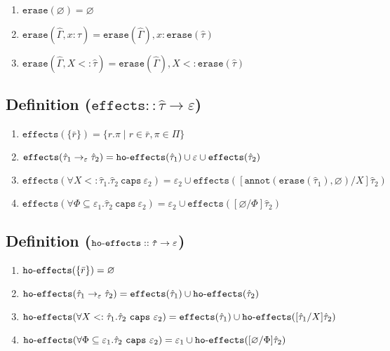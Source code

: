 \documentclass{llncs}
\newcommand{\keywadj}[1]{\mathtt{#1}}
\newcommand{\keyw}[1]{\keywadj{#1}~}
\newcommand{\kw}[1]{\keyw{ #1 }}
\newcommand{\kwa}[1]{\keywadj{ #1 }}
\newcommand{\hyphen}{\hbox{-}}
\newcommand{\fx}[1]{ \kwa{effects}(#1) }
\newcommand{\hofx}[1]{ \kwa{ho \hyphen effects}(#1) }
\newcommand{\annot}[2]{
	\keywadj{annot}(#1, #2)
}
\newcommand{\erase}[1]{
	\keywadj{erase}(#1)
}
\begin{document}
\begin{enumerate}
	\item $\erase{\varnothing} = \varnothing$
	\item $\erase{\hat \Gamma, x: \hat \tau} = \erase{\hat \Gamma}, x: \erase{\hat \tau}$
	\item $\erase{\hat \Gamma, X <: \hat \tau} = \erase{\hat \Gamma}, X <: \erase{\hat \tau}$
\end{enumerate}



\subsection*{Definition ($\kwa{effects :: \hat \tau \rightarrow \varepsilon}$)}

\begin{enumerate}
	\item $\fx{\{ \bar r \}} = \{ r.\pi \mid r \in \bar r, \pi \in \Pi \}$
	\item $\fx{\hat \tau_1 \rightarrow_{\varepsilon} \hat \tau_2} = \kwa{ho \hyphen effects}(\hat \tau_1) \cup \varepsilon \cup \kwa{effects}(\hat \tau_2)$
	\item $\fx{\forall X <: \hat \tau_1. \hat \tau_2 ~\kw{caps} \varepsilon_2} = \varepsilon_2 \cup \fx{[\annot{\erase{\hat \tau_1}}{\varnothing}/X]\hat \tau_2}$
	\item $\fx{\forall \Phi \subseteq \varepsilon_1. \hat \tau_2~\kw{caps} \varepsilon_2} = \varepsilon_2 \cup \fx{[\varnothing/\Phi]\hat \tau_2}$
\end{enumerate}


\subsection*{Definition ($\kwa{ho \hyphen effects :: \hat \tau \rightarrow \varepsilon}$)}

\begin{enumerate}
	\item $\hofx{\{ \bar r \}} = \varnothing$
	\item $\hofx{\hat \tau_1 \rightarrow_{\varepsilon} \hat \tau_2} = \kwa{effects}(\hat \tau_1) \cup \kwa{ho \hyphen effects}(\hat \tau_2)$
	\item $\hofx{\forall X <: \hat \tau_1. \hat \tau_2~\kw{caps} \varepsilon_2} = \fx{\hat \tau_1} \cup \hofx{[\hat \tau_1/X]\hat \tau_2}$
	\item $\hofx{\forall \Phi \subseteq \varepsilon_1. \hat \tau_2~\kw{caps} \varepsilon_2} = \varepsilon_1 \cup \hofx{[\varnothing/\Phi]\hat \tau_2}$
\end{enumerate}
\end{document}
